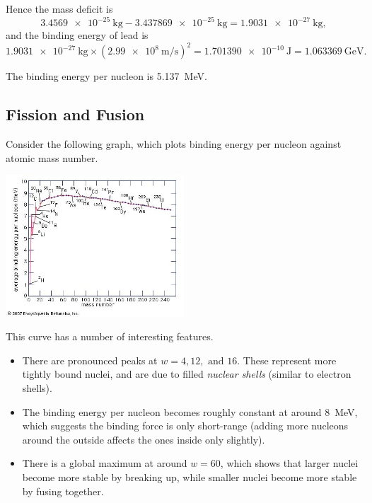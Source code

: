 \documentclass[answers]{exam}
\theoremstyle{definition}
\begin{document}
Hence the mass deficit is
\begin{displaymath}
  \SI{3.4569e-25}{\kilo\gram} - \SI{3.437869e-25}{\kilo\gram} = \SI{1.9031e-27}{\kilo\gram},
\end{displaymath}
and the binding energy of lead is
\begin{displaymath}
  \SI{1.9031e-27}{\kilo\gram} \times \left( \SI{2.99e8}{\metre\per\second} \right)^2 = \SI{1.701390e-10}{\joule} = \SI{1.063369}{\giga\electronvolt}.
\end{displaymath}

The binding energy per nucleon is \SI{5.137}{\mega\electronvolt}.

\clearpage
\subsection*{Fission and Fusion}
Consider the following graph, which plots binding energy per nucleon against atomic mass number.
\begin{center}
  \includegraphics[width=0.5\textwidth]{bindinges}
\end{center}

This curve has a number of interesting features.
\begin{itemize}
  \item There are pronounced peaks at $ w = 4, 12, \text{ and } 16 $. These represent more tightly bound
        nuclei, and are due to filled \textit{nuclear shells} (similar to electron shells).
  \item The binding energy per nucleon becomes roughly constant at around \SI{8}{\mega\electronvolt}, which
        suggests the binding force is only short-range (adding more nucleons around the outside affects the ones
        inside only slightly).
  \item There is a global maximum at around $ w = 60 $, which shows that larger nuclei become more stable by
        breaking up, while smaller nuclei become more stable by fusing together.
\end{itemize}
\end{document}
